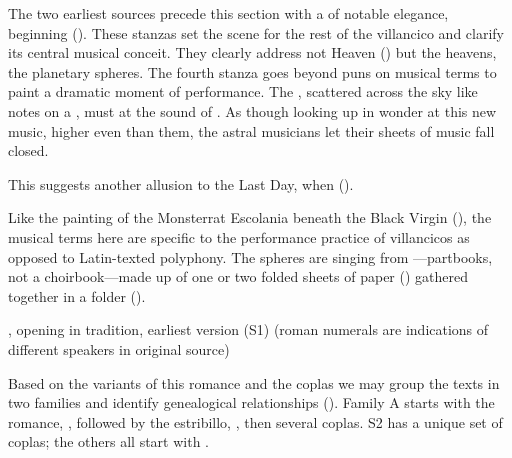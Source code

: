 The two earliest sources precede this section with a  of notable
elegance, beginning 
().
These stanzas set the scene for the rest of the villancico and clarify its
central musical conceit.
They clearly address not Heaven () but the heavens, the
planetary spheres.
The fourth stanza goes beyond puns on musical terms to paint a dramatic moment
of performance.
The , scattered across the sky like notes on a , must  at the sound of .
As though looking up in wonder at this new music, higher even than them, the
astral musicians let their sheets of music fall closed.%
\begin{Footnote}
    This suggests another allusion to the Last Day, when  ().
\end{Footnote}
Like the painting of the Monsterrat Escolania beneath the Black Virgin
(), the musical terms here are specific to the
performance practice of villancicos as opposed to Latin-texted polyphony.
The spheres are singing from ---partbooks, not a
choirbook---made up of one or two folded sheets of paper () gathered together in a folder ().


\begin{poemexample}
    \caption{, opening  in
     tradition, earliest version (S1) (roman numerals
    are indications of different speakers in original source)}
    \label{poem:Ha_de_los_coros}
\end{poemexample}

Based on the variants of this romance and the coplas we may group the
texts in two families and identify genealogical relationships
().
Family A starts with the romance, ,
followed by the estribillo, ,
then several coplas.
S2 has a unique set of coplas; the others all start with .


